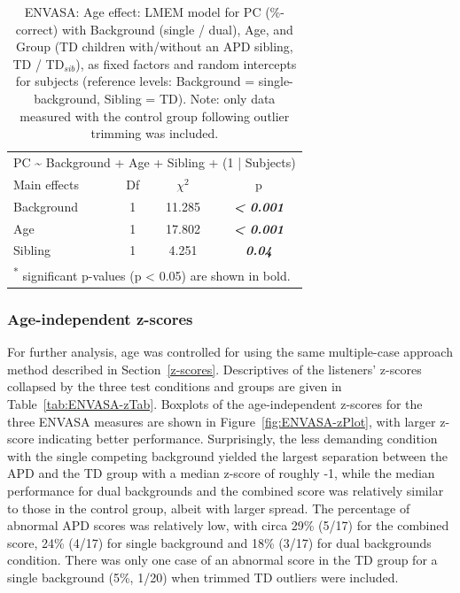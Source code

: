 \documentclass[a4paper, twoside]{templates/ociamthesis}
\begin{document}
\begin{table}

\caption{\label{tab:ENVASA-AgeLMEMTab}ENVASA: Age effect: LMEM model for PC (\%-correct) with Background (single / dual), Age, and Group (TD children with/without an APD sibling, TD / TD$_{sib}$), as fixed factors and random intercepts for subjects (reference levels: Background = single-background, Sibling = TD). Note: only data measured with the control group following outlier trimming was included.}
\centering
\begin{tabular}[t]{lcc>{}c}
\toprule
\multicolumn{4}{c}{PC \textasciitilde{} Background + Age + Sibling + (1 | Subjects)} \\
\cmidrule(l{3pt}r{3pt}){1-4}
Main effects & Df & $\chi^{2}$ & p\\
\midrule
Background & 1 & 11.285 & \em{\textbf{< 0.001}}\\
Age & 1 & 17.802 & \em{\textbf{< 0.001}}\\
Sibling & 1 & 4.251 & \em{\textbf{0.04}}\\
\bottomrule
\multicolumn{4}{l}{\textsuperscript{*} significant p-values (p < 0.05) are shown in bold.}\\
\end{tabular}
\end{table}

\hypertarget{age-independent-z-scores-3}{%
\subsubsection*{Age-independent z-scores}\label{age-independent-z-scores-3}}

For further analysis, age was controlled for using the same multiple-case approach method described in Section~\ref{z-scores}. Descriptives of the listeners' z-scores collapsed by the three test conditions and groups are given in Table~\ref{tab:ENVASA-zTab}. Boxplots of the age-independent z-scores for the three ENVASA measures are shown in Figure~\ref{fig:ENVASA-zPlot}, with larger z-score indicating better performance. Surprisingly, the less demanding condition with the single competing background yielded the largest separation between the APD and the TD group with a median z-score of roughly -1, while the median performance for dual backgrounds and the combined score was relatively similar to those in the control group, albeit with larger spread. The percentage of abnormal APD scores was relatively low, with circa 29\% (5/17) for the combined score, 24\% (4/17) for single background and 18\% (3/17) for dual backgrounds condition. There was only one case of an abnormal score in the TD group for a single background (5\%, 1/20) when trimmed TD outliers were included.\\
\end{document}

